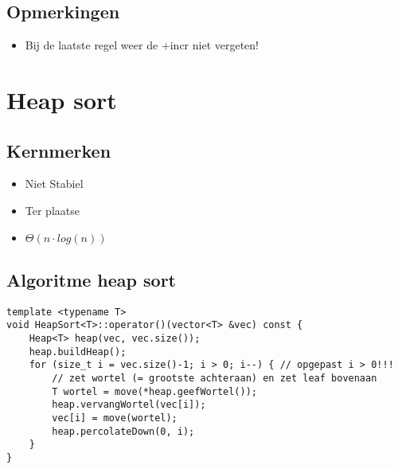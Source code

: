 \documentclass[a4paper]{article}
\begin{document}
\subsection*{Opmerkingen}
\begin{itemize}
	\item Bij de laatste regel weer de +incr niet vergeten!
\end{itemize}
\newpage

\section{Heap sort}
\subsection*{Kernmerken}
\begin{itemize}
	\item Niet Stabiel
	\item Ter plaatse
	\item $\Theta(n \cdot log(n))$
\end{itemize}

\subsection*{Algoritme heap sort}
\begin{lstlisting}
template <typename T>
void HeapSort<T>::operator()(vector<T> &vec) const {
	Heap<T> heap(vec, vec.size());
	heap.buildHeap();
	for (size_t i = vec.size()-1; i > 0; i--) { // opgepast i > 0!!!
		// zet wortel (= grootste achteraan) en zet leaf bovenaan
		T wortel = move(*heap.geefWortel());
		heap.vervangWortel(vec[i]);
		vec[i] = move(wortel);
		heap.percolateDown(0, i);
	}
}
\end{lstlisting}
\end{document}
